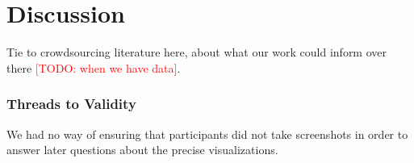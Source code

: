 \documentclass[10pt,journal,compsoc]{IEEEtran}
\newcommand{\note}[2]{\textcolor{#1}{[#2]}}
\newcommand{\todo}[1]{\note{red}{TODO: #1}}
\begin{document}
\section{Discussion}\label{sec:discussion}

Tie to crowdsourcing literature here, about what our work could inform over there \todo{when we have data}.

\subsubsection{Threads to Validity} %

We had no way of ensuring that participants did not take screenshots in order to answer later questions about the precise visualizations.

%
%

\end{document}
